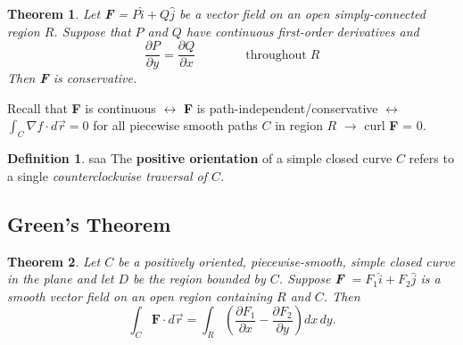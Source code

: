 \documentclass[12pt, a4paper]{article}
\theoremstyle{plain}
\newtheorem{theorem}{Theorem}[section]
\theoremstyle{definition}
\newtheorem{definition}{Definition}[section]
\theoremstyle{remark}
\begin{document}
\begin{theorem}
Let \textbf{F} = $P \hat{i}+ Q \hat{j}$ be a vector field on an open simply-connected region $R$. Suppose that $P$ and $Q$ have continuous first-order derivatives and 
$$ \frac{\partial P}{\partial y} = \frac{\partial Q}{\partial x} \quad \quad \quad \quad \text{throughout} \; R $$
Then \textbf{F} is conservative.
\end{theorem}

\vspace{.05in}
Recall that \textbf{F} is continuous $\leftrightarrow$ \textbf{F} is path-independent/conservative $\leftrightarrow$ $\int_C \nabla f \cdot d \vec{r} = 0$ for all piecewise smooth paths $C$ in region $R$ $\rightarrow$ curl \textbf{F} = 0.
\vspace{.05in}

\begin{definition}saa
The \textbf{positive orientation} of a simple closed curve $C$ refers to a single \it{counterclockwise} traversal of $C$.
\end{definition}



\subsection{Green's Theorem}
\begin{theorem}
Let $C$ be a positively oriented, piecewise-smooth, simple closed curve in the plane and let $D$ be the region bounded by $C$. Suppose \textbf{F} $= F_1 \hat{i} + F_2 \hat{j}$ is a smooth vector field on an open region containing $R$ and $C$. Then
$$ \int_C \textbf{F} \cdot d \vec{r} =  \int_R \left( \frac{\partial F_1}{\partial x} - \frac{\partial F_2}{\partial y} \right) dx \, dy.$$
\end{theorem}



\begin{center}
\end{center}
\end{document}
